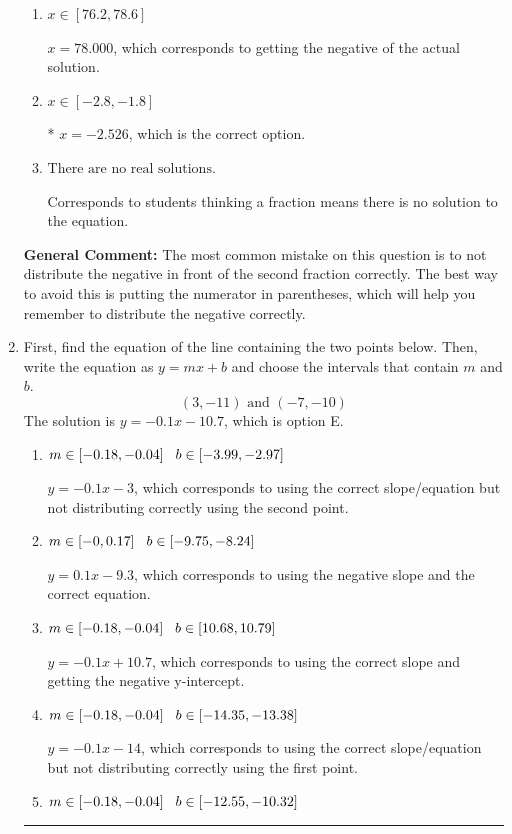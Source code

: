 \documentclass{extbook}[14pt]
\newcommand{\litem}[1]{\item #1

\rule{\textwidth}{0.4pt}}
\begin{document}
\begin{enumerate}
{\begin{enumerate}[label=\Alph*.]
$x = -4.105$, which corresponds to not distributing the negative in front of the second parentheses correctly.
\item \( x \in [76.2, 78.6] \)

$x = 78.000$, which corresponds to getting the negative of the actual solution.
\item \( x \in [-2.8, -1.8] \)

* $x = -2.526$, which is the correct option.
\item \( \text{There are no real solutions.} \)

Corresponds to students thinking a fraction means there is no solution to the equation.
\end{enumerate}

\textbf{General Comment:} The most common mistake on this question is to not distribute the negative in front of the second fraction correctly. The best way to avoid this is putting the numerator in parentheses, which will help you remember to distribute the negative correctly.
}
\litem{
First, find the equation of the line containing the two points below. Then, write the equation as $ y=mx+b $ and choose the intervals that contain $m$ and $b$.
\[ (3, -11) \text{ and } (-7, -10) \]The solution is \( y = -0.1x -10.7 \), which is option E.\begin{enumerate}[label=\Alph*.]
\item \( m \in [-0.18, -0.04] \hspace*{3mm} b \in [-3.99, -2.97] \)

 $y = -0.1x -3$, which corresponds to using the correct slope/equation but not distributing correctly using the second point.
\item \( m \in [-0, 0.17] \hspace*{3mm} b \in [-9.75, -8.24] \)

 $y = 0.1x -9.3$, which corresponds to using the negative slope and the correct equation.
\item \( m \in [-0.18, -0.04] \hspace*{3mm} b \in [10.68, 10.79] \)

 $y = -0.1x + 10.7$, which corresponds to using the correct slope and getting the negative y-intercept.
\item \( m \in [-0.18, -0.04] \hspace*{3mm} b \in [-14.35, -13.38] \)

 $y = -0.1x -14$, which corresponds to using the correct slope/equation but not distributing correctly using the first point.
\item \( m \in [-0.18, -0.04] \hspace*{3mm} b \in [-12.55, -10.32] \)


\end{enumerate}}
\end{enumerate}
\end{document}
